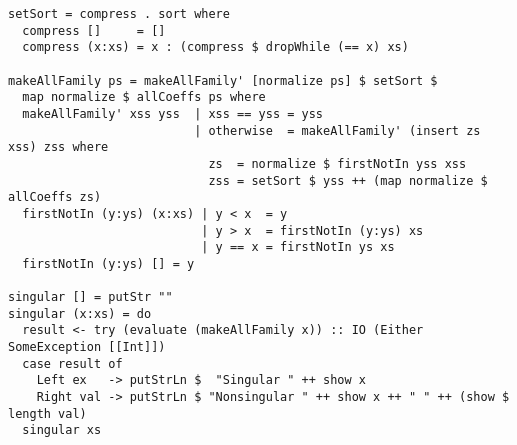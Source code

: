 \documentclass[bibliography=totoc, a4paper, 14pt]{extarticle}
\begin{document}
\begin{footnotesize}
\begin{verbatim}
setSort = compress . sort where
  compress []     = []
  compress (x:xs) = x : (compress $ dropWhile (== x) xs)

makeAllFamily ps = makeAllFamily' [normalize ps] $ setSort $
  map normalize $ allCoeffs ps where
  makeAllFamily' xss yss  | xss == yss = yss    
                          | otherwise  = makeAllFamily' (insert zs xss) zss where
                            zs  = normalize $ firstNotIn yss xss
                            zss = setSort $ yss ++ (map normalize $ allCoeffs zs)
  firstNotIn (y:ys) (x:xs) | y < x  = y
                           | y > x  = firstNotIn (y:ys) xs
                           | y == x = firstNotIn ys xs
  firstNotIn (y:ys) [] = y

singular [] = putStr ""
singular (x:xs) = do
  result <- try (evaluate (makeAllFamily x)) :: IO (Either SomeException [[Int]])
  case result of
    Left ex   -> putStrLn $  "Singular " ++ show x
    Right val -> putStrLn $ "Nonsingular " ++ show x ++ " " ++ (show $ length val)
  singular xs
\end{verbatim}
\end{footnotesize}

\makeatletter
\renewcommand*{\@biblabel}[1]{\hfill#1.}
\makeatother
\end{document}

